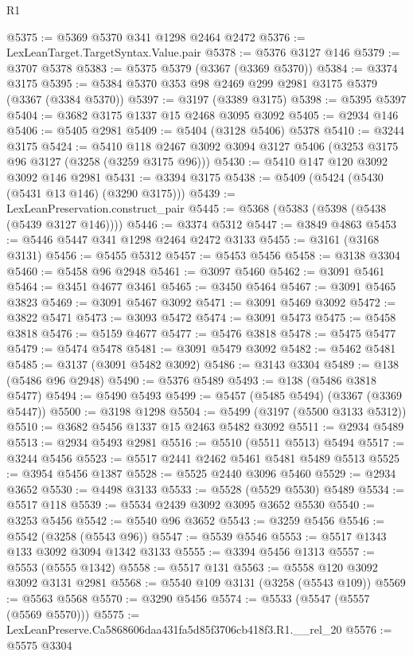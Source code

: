 \begin{lexlean}{R1}
\begin{coremodule}
@5375 := @5369 @5370 @341 @1298 @2464 @2472
@5376 := LexLeanTarget.TargetSyntax.Value.pair
@5378 := @5376 @3127 @146
@5379 := @3707 @5378
@5383 := @5375 @5379 (@3367 (@3369 @5370))
@5384 := @3374 @3175
@5395 := @5384 @5370 @353 @98 @2469 @299 @2981 @3175 @5379 (@3367 (@3384 @5370))
@5397 := @3197 (@3389 @3175)
@5398 := @5395 @5397
@5404 := @3682 @3175 @1337 @15 @2468 @3095 @3092
@5405 := @2934 @146
@5406 := @5405 @2981
@5409 := @5404 (@3128 @5406) @5378
@5410 := @3244 @3175
@5424 := @5410 @118 @2467 @3092 @3094 @3127 @5406 (@3253 @3175 @96 @3127 (@3258 (@3259 @3175 @96)))
@5430 := @5410 @147 @120 @3092 @3092 @146 @2981
@5431 := @3394 @3175
@5438 := @5409 (@5424 (@5430 (@5431 @13 @146) (@3290 @3175)))
@5439 := LexLeanPreservation.construct_pair
@5445 := @5368 (@5383 (@5398 (@5438 (@5439 @3127 @146))))
@5446 := @3374 @5312
@5447 := @3849 @4863
@5453 := @5446 @5447 @341 @1298 @2464 @2472 @3133
@5455 := @3161 (@3168 @3131)
@5456 := @5455 @5312
@5457 := @5453 @5456
@5458 := @3138 @3304
@5460 := @5458 @96 @2948
@5461 := @3097 @5460
@5462 := @3091 @5461
@5464 := @3451 @4677 @3461
@5465 := @3450 @5464
@5467 := @3091 @5465 @3823
@5469 := @3091 @5467 @3092
@5471 := @3091 @5469 @3092
@5472 := @3822 @5471
@5473 := @3093 @5472
@5474 := @3091 @5473
@5475 := @5458 @3818
@5476 := @5159 @4677
@5477 := @5476 @3818
@5478 := @5475 @5477
@5479 := @5474 @5478
@5481 := @3091 @5479 @3092
@5482 := @5462 @5481
@5485 := @3137 (@3091 @5482 @3092)
@5486 := @3143 @3304
@5489 := @138 (@5486 @96 @2948)
@5490 := @5376 @5489
@5493 := @138 (@5486 @3818 @5477)
@5494 := @5490 @5493
@5499 := @5457 (@5485 @5494) (@3367 (@3369 @5447))
@5500 := @3198 @1298
@5504 := @5499 (@3197 (@5500 @3133 @5312))
@5510 := @3682 @5456 @1337 @15 @2463 @5482 @3092
@5511 := @2934 @5489
@5513 := @2934 @5493 @2981
@5516 := @5510 (@5511 @5513) @5494
@5517 := @3244 @5456
@5523 := @5517 @2441 @2462 @5461 @5481 @5489 @5513
@5525 := @3954 @5456 @1387
@5528 := @5525 @2440 @3096 @5460
@5529 := @2934 @3652
@5530 := @4498 @3133
@5533 := @5528 (@5529 @5530) @5489
@5534 := @5517 @118
@5539 := @5534 @2439 @3092 @3095 @3652 @5530
@5540 := @3253 @5456
@5542 := @5540 @96 @3652
@5543 := @3259 @5456
@5546 := @5542 (@3258 (@5543 @96))
@5547 := @5539 @5546
@5553 := @5517 @1343 @133 @3092 @3094 @1342 @3133
@5555 := @3394 @5456 @1313
@5557 := @5553 (@5555 @1342)
@5558 := @5517 @131
@5563 := @5558 @120 @3092 @3092 @3131 @2981
@5568 := @5540 @109 @3131 (@3258 (@5543 @109))
@5569 := @5563 @5568
@5570 := @3290 @5456
@5574 := @5533 (@5547 (@5557 (@5569 @5570)))
@5575 := LexLeanPreserve.Ca5868606daa431fa5d85f3706cb418f3.R1.__rel_20
@5576 := @5575 @3304

\end{coremodule}
\end{lexlean}
